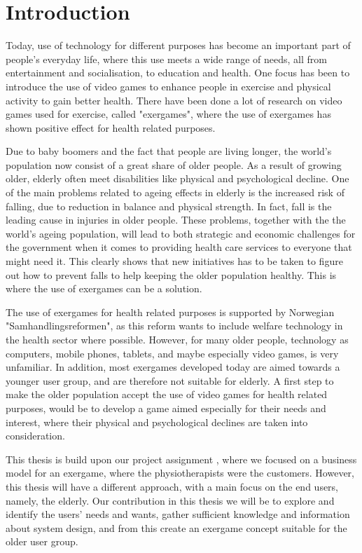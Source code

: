 \chapter{Introduction}

Today, use of technology for different purposes has become an important part of people's everyday life, where this use meets a wide range of needs, all from entertainment and socialisation, to education and health. One focus has been to introduce the use of video games to enhance people in exercise and physical activity to gain better health. There have been done a lot of research on video games used for exercise, called "exergames", where the use of exergames has shown positive effect for health related purposes. 

Due to baby boomers and the fact that people are living longer, the world's population now consist of a great share of older people. As a result of growing older, elderly often meet disabilities like physical and psychological decline. One of the main problems related to ageing effects in elderly is the increased risk of falling, due to reduction in balance and physical strength. In fact, fall is the leading cause in injuries in older people. These problems, together with the the world's ageing population, will lead to both strategic and economic challenges for the government when it comes to providing health care services to everyone that might need it. This clearly shows that new initiatives has to be taken to figure out how to prevent falls to help keeping the older population healthy. This is where the use of exergames can be a solution. 

The use of exergames for health related purposes is supported by Norwegian "Samhandlingsreformen", as this reform wants to include welfare technology in the health sector where possible. However, for many older people, technology as computers, mobile phones, tablets, and maybe especially video games, is very unfamiliar. In addition, most exergames developed today are aimed towards a younger user group, and are therefore not suitable for elderly. A first step to make the older population accept the use of video games for health related purposes, would be to develop a game aimed especially for their needs and interest, where their physical and psychological declines are taken into consideration. 

This thesis is build upon our project assignment \cite{project}, where we focused on a business model for an exergame, where the physiotherapists were the customers. However, this thesis will have a different approach, with a main focus on the end users, namely, the elderly. Our contribution in this thesis we will be to explore and identify the users' needs and wants, gather sufficient knowledge and information about system design, and from this create an exergame concept suitable for the older user group.

